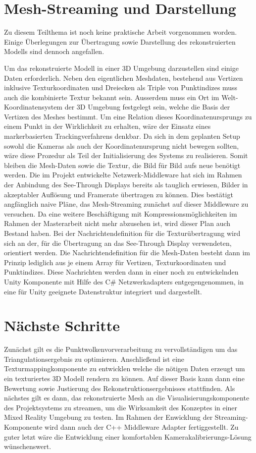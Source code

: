 \section{Mesh-Streaming und Darstellung}
Zu diesem Teilthema ist noch keine praktische Arbeit vorgenommen worden. Einige 
Überlegungen zur Übertragung sowie Darstellung des rekonstruierten Modells sind 
dennoch angefallen.

Um das rekonstruierte Modell in einer 3D Umgebung darzustellen sind einige Daten 
erforderlich. Neben den eigentlichen Meshdaten, bestehend aus Vertizen inklusive 
Texturkoordinaten und Dreiecken als Triple von Punktindizes muss auch die 
kombinierte Textur bekannt sein. Ausserdem muss ein Ort im Welt-Koordinatensystem 
der 3D Umgebung festgelegt sein, welche die Basis der Vertizen des Meshes bestimmt.
Um eine Relation dieses Koordinatenursprungs zu einem Punkt in der Wirklichkeit zu 
erhalten, wäre der Einsatz eines markerbasierten Trackingverfahrens denkbar. Da sich 
in dem geplanten Setup sowohl die Kameras als auch der Koordinatenursprung nicht 
bewegen sollten, wäre diese Prozedur als Teil der Initialisierung des Systems zu 
realisieren. Somit bleiben die Mesh-Daten sowie die Textur, die Bild für Bild aufs 
neue benötigt werden. Die im Projekt entwickelte Netzwerk-Middleware hat sich im 
Rahmen der Anbindung des See-Through Displays bereits als tauglich erwiesen, Bilder 
in akzeptabler Auflösung und Framerate übertragen zu können. Dies bestätigt 
angfänglich naive Pläne, das Mesh-Streaming zunächst auf dieser Middleware zu 
versuchen. Da eine weitere Beschäftigung mit Kompressionsmöglichkeiten im Rahmen der 
Masterarbeit nicht mehr abzusehen ist, wird dieser Plan auch Bestand haben. Bei der 
Nachrichtendefinition für die Texturübertragung wird sich an der, für die 
Übertragung an das See-Through Display verwendeten, orientiert werden. Die 
Nachrichtendefinition für die Mesh-Daten besteht dann im Prinzip lediglich aus je 
einem Array für Vertizen, Texturkoordinaten und Punktindizes. Diese Nachrichten 
werden dann in einer noch zu entwickelnden Unity Komponente mit Hilfe des C\# 
Netzwerkadapters entgegengenommen, in eine für Unity geeignete Datenstruktur 
integriert und dargestellt.

\section{Nächste Schritte} 
Zunächst gilt es die Punktwolkenvorverarbeitung zu vervollständigen um das 
Triangulationsergebnis zu optimieren. Anschließend ist eine Texturmappingkomponente 
zu entwicklen welche die nötigen Daten erzeugt um ein texturiertes 3D Modell rendern 
zu können. Auf dieser Basis kann dann eine Bewertung sowie Justierung des 
Rekonstruktionsergebnisses stattfinden. Als nächstes gilt es dann, das rekonstruierte 
Mesh an die Visualisierungskomponente des Projektsystems zu streamen, um die 
Wirksamkeit des Konzeptes in einer Mixed Reality Umgebung zu testen. Im Rahmen der 
Enwicklung der Streaming-Komponente wird dann auch der C++ Middleware Adapter 
fertiggestellt. Zu guter letzt wäre die Entwicklung einer komfortablen 
Kamerakalibrierungs-Lösung wünschenswert.
